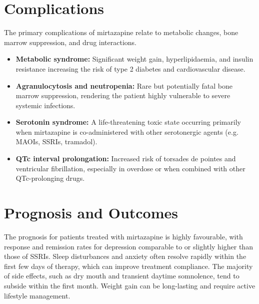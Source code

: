 \section*{Complications}
The primary complications of mirtazapine relate to metabolic changes, bone marrow suppression, and drug interactions.
\begin{itemize}
    \item \textbf{Metabolic syndrome:} Significant weight gain, hyperlipidaemia, and insulin resistance increasing the risk of type 2 diabetes and cardiovascular disease.
    \item \textbf{Agranulocytosis and neutropenia:} Rare but potentially fatal bone marrow suppression, rendering the patient highly vulnerable to severe systemic infections.
    \item \textbf{Serotonin syndrome:} A life-threatening toxic state occurring primarily when mirtazapine is co-administered with other serotonergic agents (e.g. MAOIs, SSRIs, tramadol).
    \item \textbf{QTc interval prolongation:} Increased risk of torsades de pointes and ventricular fibrillation, especially in overdose or when combined with other QTc-prolonging drugs.
\end{itemize}

\section*{Prognosis and Outcomes}
The prognosis for patients treated with mirtazapine is highly favourable, with response and remission rates for depression comparable to or slightly higher than those of SSRIs. Sleep disturbances and anxiety often resolve rapidly within the first few days of therapy, which can improve treatment compliance. The majority of side effects, such as dry mouth and transient daytime somnolence, tend to subside within the first month. Weight gain can be long-lasting and require active lifestyle management.

